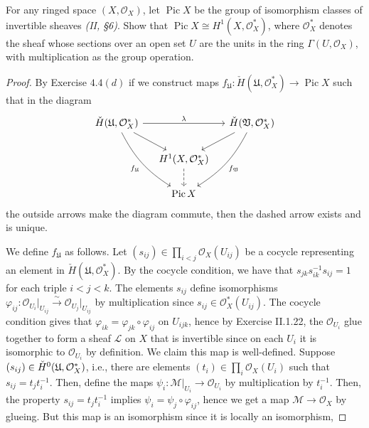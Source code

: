 \documentclass[10pt]{article}
\theoremstyle{definition}
\theoremstyle{remark}
\numberwithin{equation}{section}
\numberwithin{figure}{subsubsection}
\let\Im\relax
\DeclareMathOperator{\Im}{im}
\DeclareMathOperator{\Pic}{Pic}
\newcommand{\LL}{\mathscr{L}}
\newcommand{\MM}{\mathscr{M}}
\newcommand{\OO}{\mathcal{O}}
\newcommand{\isoto}{\overset{\sim}{\to}}
\begin{document}
\setcounter{subsubsection}{4}
\begin{problem}
  For any ringed space $(X,\OO_X)$, let $\Pic X$ be the group of isomorphism
  classes of invertible sheaves \emph{(II, \S6)}. Show that $\Pic X \cong
  H^1(X,\OO_X^*)$, where $\OO_X^*$ denotes the sheaf whose sections over an open
  set $U$ are the units in the ring $\Gamma(U,\OO_X)$, with multiplication as the
  group operation.
\end{problem}
\begin{proof}
  By Exercise $4.4(d)$ if we construct maps $f_\mathfrak{U}\colon
  \check{H}(\mathfrak{U},\OO_X^*) \to \Pic X$ such that in the diagram
  \begin{equation*}
    \begin{tikzcd}[column sep=small]
      \check{H}(\mathfrak{U},\OO_X^*) \arrow{rr}{\lambda}
      \arrow{dr} \arrow[bend right=15]{ddr}[swap]{f_\mathfrak{U}} & &
      \check{H}(\mathfrak{V},\OO_X^*) \arrow{dl}
      \arrow[bend left=15]{ddl}{f_\mathfrak{V}}\\
      & H^1(X,\OO_X^*)\dar[dashed]\\
      & \Pic X
    \end{tikzcd}
  \end{equation*}
  the outside arrows make the diagram commute, then the dashed arrow exists and
  is unique.
  \par We define $f_\mathfrak{U}$ as follows. Let $(s_{ij}) \in \prod_{i < j}
  \OO_X(U_{ij})$ be a cocycle representing an element in
  $\check{H}(\mathfrak{U},\OO_X^*)$. By the cocycle condition, we have that
  $s_{jk}s_{ik}^{-1}s_{ij} = 1$ for each triple $i < j < k$. The elements
  $s_{ij}$ define isomorphisms $\varphi_{ij} \colon
  \OO_{U_{i}}\rvert_{U_{ij}} \isoto \OO_{U_{j}}\rvert_{U_{ij}}$
  by multiplication since $s_{ij} \in \OO^*_{X}(U_{ij})$. The cocycle
  condition gives that $\varphi_{ik} = \varphi_{jk} \circ \varphi_{ij}$ on $U_{ijk}$,
  hence by Exercise II.1.22, the $\OO_{U_i}$ glue together to form a sheaf $\LL$ on
  $X$ that is invertible since on each $U_i$ it is isomorphic to $\OO_{U_i}$ by
  definition. We claim this map is well-defined. Suppose
  $(s_{ij}) \in \Im \check{H}^0(\mathfrak{U},\OO_X^*)$,
  i.e., there are elements $(t_i) \in
  \prod_i \OO_X(U_i)$ such that $s_{ij} = t_jt_i^{-1}$. Then,
  define the maps
  $\psi_i\colon \MM\rvert_{U_i} \to \OO_{U_i}$ by multiplication by
  $t_i^{-1}$. Then, the property $s_{ij} = t_jt_i^{-1}$ implies
  $\psi_i = \psi_j\circ\varphi_{ij}$, hence we get a map $\MM \to \OO_X$ by
  glueing. But this map is an isomorphism since it is locally an isomorphism,

\end{proof}
\end{document}
